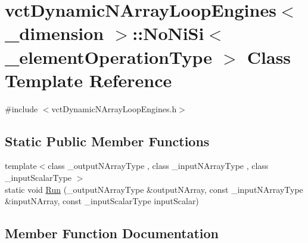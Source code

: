 \hypertarget{classvct_dynamic_n_array_loop_engines_1_1_no_ni_si}{}\section{vct\+Dynamic\+N\+Array\+Loop\+Engines$<$ \+\_\+dimension $>$\+:\+:No\+Ni\+Si$<$ \+\_\+element\+Operation\+Type $>$ Class Template Reference}
\label{classvct_dynamic_n_array_loop_engines_1_1_no_ni_si}


{\ttfamily \#include $<$vct\+Dynamic\+N\+Array\+Loop\+Engines.\+h$>$}

\subsection*{Static Public Member Functions}
\begin{DoxyCompactItemize}
\item 
{\footnotesize template$<$class \+\_\+output\+N\+Array\+Type , class \+\_\+input\+N\+Array\+Type , class \+\_\+input\+Scalar\+Type $>$ }\\static void \hyperlink{classvct_dynamic_n_array_loop_engines_1_1_no_ni_si_af5a301f4e05e4d8e6fcd6b178628fe34}{Run} (\+\_\+output\+N\+Array\+Type \&output\+N\+Array, const \+\_\+input\+N\+Array\+Type \&input\+N\+Array, const \+\_\+input\+Scalar\+Type input\+Scalar)
\end{DoxyCompactItemize}


\subsection{Member Function Documentation}
\hypertarget{classvct_dynamic_n_array_loop_engines_1_1_no_ni_si_af5a301f4e05e4d8e6fcd6b178628fe34}{}
